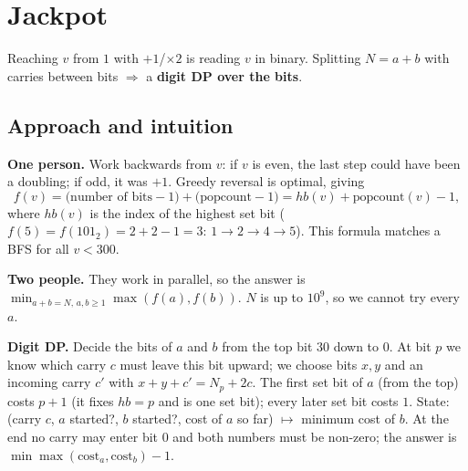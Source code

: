 \section{Jackpot}
\label{sec:b-jackpot}


\begin{patternbox}
Reaching $v$ from $1$ with $+1$/$\times2$ is reading $v$ in binary. Splitting
$N=a+b$ with carries between bits $\Rightarrow$ a \textbf{digit DP over the
bits}.
\end{patternbox}

\subsection*{Approach and intuition}

\textbf{One person.} Work backwards from $v$: if $v$ is even, the last step
could have been a doubling; if odd, it was $+1$. Greedy reversal is optimal,
giving
\[
  f(v)=\bigl(\text{number of bits}-1\bigr)+\bigl(\text{popcount}-1\bigr)=hb(v)+\text{popcount}(v)-1,
\]
where $hb(v)$ is the index of the highest set bit ($f(5)=f(101_2)=2+2-1=3$:
$1\to2\to4\to5$). This formula matches a BFS for all $v<300$.

\textbf{Two people.} They work in parallel, so the answer is
$\min_{a+b=N,\,a,b\ge1}\max(f(a),f(b))$. $N$ is up to $10^9$, so we cannot try
every $a$.

\textbf{Digit DP.} Decide the bits of $a$ and $b$ from the top bit $30$ down
to $0$. At bit $p$ we know which carry $c$ must leave this bit upward; we
choose bits $x,y$ and an incoming carry $c'$ with $x+y+c'=N_p+2c$. The first
set bit of $a$ (from the top) costs $p+1$ (it fixes $hb=p$ and is one set bit);
every later set bit costs $1$. State: (carry $c$, $a$ started?, $b$
started?, cost of $a$ so far) $\mapsto$ minimum cost of $b$. At the end no
carry may enter bit $0$ and both numbers must be non-zero; the answer is
$\min\max(\text{cost}_a,\text{cost}_b)-1$.

